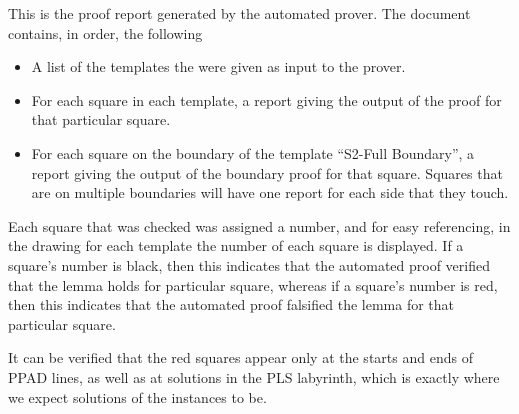 This is the proof report generated by the automated prover. 
The document contains, in order, the following
\begin{itemize}
\item A list of the templates the were given as input to the prover.
\item For each square in each template, a report giving the output of the proof
for that particular square.
\item For each square on the boundary of the template ``S2-Full Boundary'', a
report giving the output of the boundary proof for that square. Squares that are
on multiple boundaries will have one report for each side that they touch.
\end{itemize}


Each square that was checked was assigned a number, and for easy referencing, in the drawing for each
template the number of each square is displayed. If a square's number is black,
then this indicates that the automated proof verified that the lemma holds for particular square,
whereas if a square's number is red, then this indicates that the automated
proof falsified the lemma for that particular square.

It can be verified that the red squares appear only at the starts and ends of
PPAD lines, as well as at solutions in the PLS labyrinth, which is exactly where 
we expect solutions of the instances to be.
